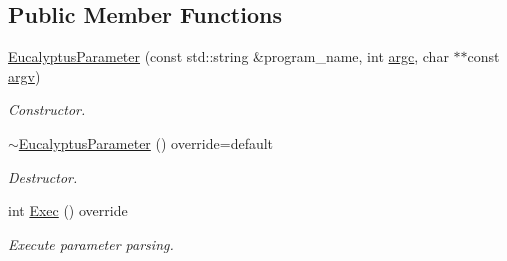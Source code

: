 \subsection*{Public Member Functions}
\begin{DoxyCompactItemize}
\item 
\hyperlink{classEucalyptusParameter_a71d938d0ee56b27250aff0ce1044c320}{Eucalyptus\+Parameter} (const std\+::string \&program\+\_\+name, int \hyperlink{classParameter_a76b21c2ed27f73883401229217020814}{argc}, char $\ast$$\ast$const \hyperlink{classParameter_a538da2e132ca91996baa116097d6238f}{argv})
\begin{DoxyCompactList}\small\item\em Constructor. \end{DoxyCompactList}\item 
\hyperlink{classEucalyptusParameter_a5b75b0bacf083c2ad73d35b4a17d932f}{$\sim$\+Eucalyptus\+Parameter} () override=default
\begin{DoxyCompactList}\small\item\em Destructor. \end{DoxyCompactList}\item 
int \hyperlink{classEucalyptusParameter_ac4a336c1c386a2cbd9adc9dfb637b04b}{Exec} () override
\begin{DoxyCompactList}\small\item\em Execute parameter parsing. \end{DoxyCompactList}\end{DoxyCompactItemize}
